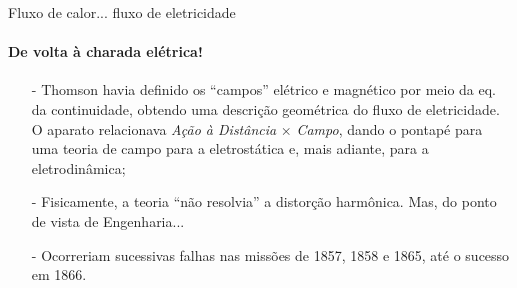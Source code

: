 \documentclass[aspectratio=169]{beamer}
\begin{document}
\begin{frame}{Fluxo de calor... fluxo de eletricidade}
\framesubtitle{De volta à charada elétrica!}
\begin{itemize}
	\item[-] Thomson havia definido os ``campos'' elétrico e magnético por meio da eq. da continuidade, obtendo uma descrição geométrica do fluxo de eletricidade. O aparato relacionava \emph{Ação à Distância} $\times$ \emph{Campo}, dando o pontapé para uma teoria de campo para a eletrostática e, mais adiante, para a eletrodinâmica;\cite{tonidandel-et-al-2018}
	\item[-] Fisicamente, a teoria ``não resolvia'' a distorção harmônica. Mas, do ponto de vista de Engenharia...
	\item[-] Ocorreriam sucessivas falhas nas missões de 1857, 1858 e 1865, até o sucesso em 1866.
\end{itemize}
\end{frame}
\end{document}
